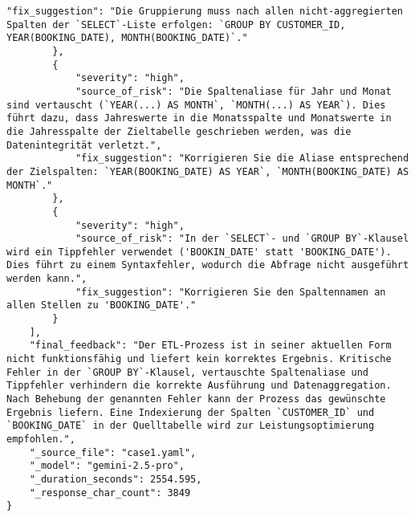 \begin{lstlisting}[caption={Ausgabe: GEMINI 2.5 Pro Anwendungsfall 1 Robustheitsdurchlauf},label={gemini_case1_prompt3}]
            "fix_suggestion": "Die Gruppierung muss nach allen nicht-aggregierten Spalten der `SELECT`-Liste erfolgen: `GROUP BY CUSTOMER_ID, YEAR(BOOKING_DATE), MONTH(BOOKING_DATE)`."
        },
        {
            "severity": "high",
            "source_of_risk": "Die Spaltenaliase für Jahr und Monat sind vertauscht (`YEAR(...) AS MONTH`, `MONTH(...) AS YEAR`). Dies führt dazu, dass Jahreswerte in die Monatsspalte und Monatswerte in die Jahresspalte der Zieltabelle geschrieben werden, was die Datenintegrität verletzt.",
            "fix_suggestion": "Korrigieren Sie die Aliase entsprechend der Zielspalten: `YEAR(BOOKING_DATE) AS YEAR`, `MONTH(BOOKING_DATE) AS MONTH`."
        },
        {
            "severity": "high",
            "source_of_risk": "In der `SELECT`- und `GROUP BY`-Klausel wird ein Tippfehler verwendet ('BOOKIN_DATE' statt 'BOOKING_DATE'). Dies führt zu einem Syntaxfehler, wodurch die Abfrage nicht ausgeführt werden kann.",
            "fix_suggestion": "Korrigieren Sie den Spaltennamen an allen Stellen zu 'BOOKING_DATE'."
        }
    ],
    "final_feedback": "Der ETL-Prozess ist in seiner aktuellen Form nicht funktionsfähig und liefert kein korrektes Ergebnis. Kritische Fehler in der `GROUP BY`-Klausel, vertauschte Spaltenaliase und Tippfehler verhindern die korrekte Ausführung und Datenaggregation. Nach Behebung der genannten Fehler kann der Prozess das gewünschte Ergebnis liefern. Eine Indexierung der Spalten `CUSTOMER_ID` und `BOOKING_DATE` in der Quelltabelle wird zur Leistungsoptimierung empfohlen.",
    "_source_file": "case1.yaml",
    "_model": "gemini-2.5-pro",
    "_duration_seconds": 2554.595,
    "_response_char_count": 3849
}
\end{lstlisting}

